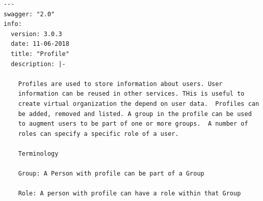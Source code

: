 \documentclass[9pt,]{article}
\begin{document}
\begin{verbatim}
---
swagger: "2.0"
info:
  version: 3.0.3
  date: 11-06-2018
  title: "Profile"
  description: |-
  
    Profiles are used to store information about users. User
    information can be reused in other services. THis is useful to
    create virtual organization the depend on user data.  Profiles can
    be added, removed and listed. A group in the profile can be used
    to augment users to be part of one or more groups.  A number of
    roles can specify a specific role of a user.

    Terminology

    Group: A Person with profile can be part of a Group

    Role: A person with profile can have a role within that Group


\end{verbatim}
\end{document}
